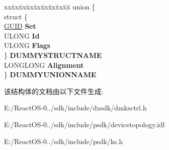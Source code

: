 \begin{DoxyCompactItemize}
\begin{tabbing}
\end{tabbing}\item 
\mbox{\label{struct_k_s_i_d_e_n_t_i_f_i_e_r_a12f2117f9c9657540853a45c7a41c15b}} 
\begin{tabbing}
xx\=xx\=xx\=xx\=xx\=xx\=xx\=xx\=xx\=\kill
union \{\\
\>struct \{\\
\>\>\hyperlink{interface_g_u_i_d}{GUID} {\bfseries Set}\\
\>\>ULONG {\bfseries Id}\\
\>\>ULONG {\bfseries Flags}\\
\>\} {\bfseries DUMMYSTRUCTNAME}\\
\>LONGLONG {\bfseries Alignment}\\
\} {\bfseries DUMMYUNIONNAME}\\

\end{tabbing}\end{DoxyCompactItemize}


该结构体的文档由以下文件生成\+:\begin{DoxyCompactItemize}
\item 
E\+:/\+React\+O\+S-\/0../sdk/include/dxsdk/dmksctrl.\+h\item 
E\+:/\+React\+O\+S-\/0../sdk/include/psdk/devicetopology.\+idl\item 
E\+:/\+React\+O\+S-\/0../sdk/include/psdk/ks.\+h\end{DoxyCompactItemize}
